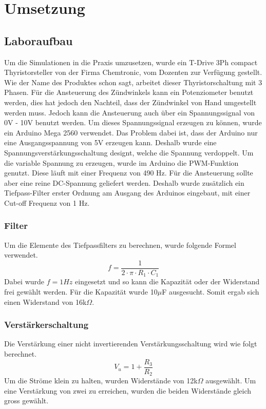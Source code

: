 \section{Umsetzung}


\subsection{Laboraufbau}
Um die Simulationen in die Praxis umzusetzen, wurde ein \grqq T-Drive 3Ph compact Thyristorsteller\grqq \hspace{0.03cm} von der Firma Chemtronic, vom Dozenten zur Verfügung gestellt. Wie der Name des Produktes schon sagt, arbeitet dieser Thyristorschaltung mit 3 Phasen. Für die Ansteuerung des Zündwinkels kann ein Potenziometer benutzt werden, dies hat jedoch den Nachteil, dass der Zündwinkel von Hand umgestellt werden muss. Jedoch kann die Ansteuerung auch über ein Spannungssignal von 0V - 10V benutzt werden. Um dieses Spannungssignal erzeugen zu können, wurde ein Arduino Mega 2560 verwendet. Das Problem dabei ist, dass der Arduino nur eine Ausgangsspannung von 5V erzeugen kann. Deshalb wurde eine Spannungsverstärkungsschaltung designt, welche die Spannung verdoppelt. Um die variable Spannung zu erzeugen, wurde im Arduino die PWM-Funktion genutzt. Diese läuft mit einer Frequenz von 490 Hz. Für die Ansteuerung sollte aber eine reine DC-Spannung geliefert werden. Deshalb wurde zusätzlich ein Tiefpass-Filter erster Ordnung am Ausgang des Arduinos eingebaut, mit einer Cut-off Frequenz von 1 Hz.  


\subsubsection{Filter}
Um die Elemente des Tiefpassfilters zu berechnen, wurde folgende Formel verwendet.
\begin{equation}
f = \frac{1}{2 \cdot \pi \cdot R_1 \cdot C_1}
\end{equation}
Dabei wurde $f = 1 Hz$ eingesetzt und so kann die Kapazität oder der Widerstand frei gewählt werden. Für die Kapazität wurde 10$\mu$F ausgesucht. Somit ergab sich einen Widerstand von 16k$\Omega$. 


\subsubsection{Verstärkerschaltung}
Die Verstärkung einer nicht invertierenden Verstärkungsschaltung wird wie folgt berechnet.
\begin{equation}
V_u = 1 + \frac{R_3}{R_2}
\end{equation}
Um die Ströme klein zu halten, wurden Widerstände von 12k$\Omega$ ausgewählt. Um eine Verstärkung von zwei zu erreichen, wurden die beiden Widerstände gleich gross gewählt. 




